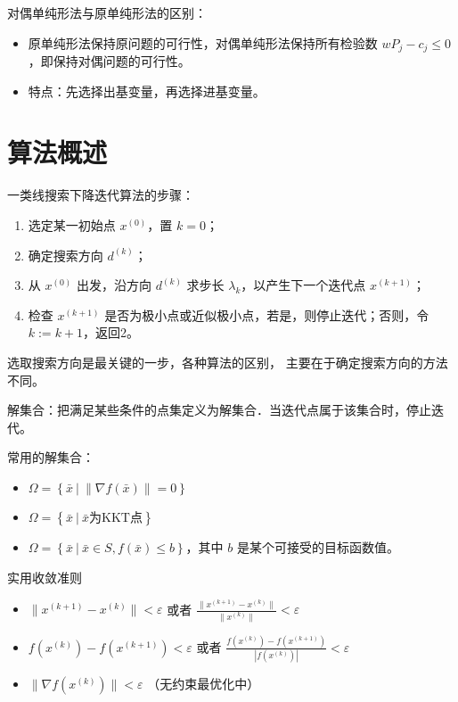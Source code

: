 \begin{remark}
    对偶单纯形法与原单纯形法的区别：
    \begin{itemize}
        \item 原单纯形法保持原问题的可行性，对偶单纯形法保持所有检验数 $wP_j - c_j \le 0$，即保持对偶问题的可行性。
        \item 特点：先选择出基变量，再选择进基变量。
    \end{itemize}
\end{remark}


\section{算法概述}
\begin{remark}
    一类线搜索下降迭代算法的步骤：
    \begin{enumerate}
        \item 选定某一初始点 $x^{(0)}$，置 $k = 0$；
        \item 确定搜索方向 $d^{(k)}$；
        \item 从 $x^{(0)}$ 出发，沿方向 $d^{(k)}$ 求步长 $\lambda_k$，以产生下一个迭代点 $x^{(k + 1)}$；
        \item 检查 $x^{(k + 1)}$ 是否为极小点或近似极小点，若是，则停止迭代；否则，令 $k:= k + 1$，返回2。
    \end{enumerate}

    选取搜索方向是最关键的一步，各种算法的区别， 主要在于确定搜索方向的方法不同。
\end{remark}

\begin{remark}
    解集合：把满足某些条件的点集定义为解集合．当迭代点属于该集合时，停止迭代。
    
    常用的解集合：
    \begin{itemize}
        \item $\Omega = \left\{\bar{x}\ |\ \|\nabla f(\bar{x})\| = 0\right\}$
        \item $\Omega = \left\{\bar{x}\ |\ \bar{x} \text{为KKT点}\right\}$
        \item $\Omega = \left\{\bar{x}\ |\ \bar{x} \in S, f(\bar{x}) \le b\right\}$，其中 $b$ 是某个可接受的目标函数值。
    \end{itemize}
\end{remark}

\begin{remark}
    实用收敛准则
    \begin{itemize}
        \item $\|x^{(k + 1)} - x^{(k)}\| < \varepsilon$ 或者 $\frac{\|x^{(k + 1)} - x^{(k)}\|}{\|x^{(k)}\|} < \varepsilon$
        \item $f(x^{(k)}) - f(x^{(k + 1)}) < \varepsilon$ 或者 $\frac{f(x^{(k)}) - f(x^{(k + 1)})}{|f(x^{(k)})|} < \varepsilon$
        \item $\|\nabla f(x^{(k)})\| < \varepsilon$ （无约束最优化中）
    \end{itemize}
\end{remark}


